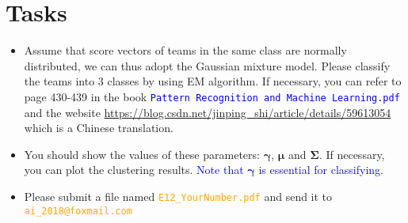 ﻿\documentclass[a4paper, 11pt]{article}
\numberwithin{equation}{subsection}
\begin{document}
\section{Tasks}
\begin{itemize}
	\item Assume that score vectors of teams in the same class are normally distributed, we can thus adopt the Gaussian mixture model. Please classify the teams into 3 classes by using EM algorithm. If necessary, you can refer to page 430-439 in the book \textcolor{blue}{\texttt{Pattern Recognition and Machine Learning.pdf}} and the website \textcolor{	orange}{\url{https://blog.csdn.net/jinping_shi/article/details/59613054}} which is a Chinese translation.
	\item You should show the values of these parameters: $\boldsymbol\gamma$, $\boldsymbol\mu$ and $\boldsymbol\Sigma$. If necessary, you can plot the clustering results. \textcolor{blue}{Note that $\boldsymbol\gamma$ is essential for classifying.}
	\item Please submit a file named \textcolor{orange}{\texttt{E12\_YourNumber.pdf}} and send it to \textcolor{orange}{\texttt{ai\_2018@foxmail.com}}
\end{itemize}
\end{document}
